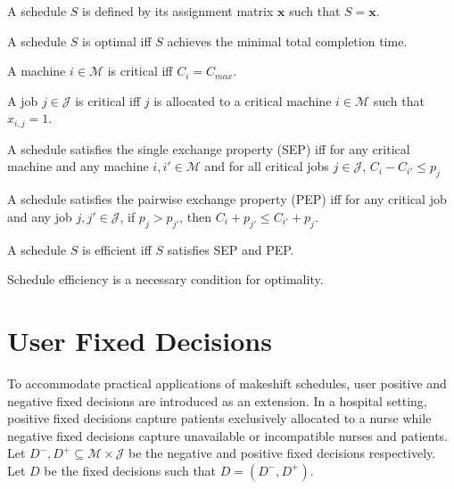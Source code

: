 \begin{definition}
	A schedule $S$ is defined by its assignment matrix $\mathbf{x}$ such that $S=\mathbf{x}$.
\end{definition}

\begin{definition}
	A schedule $S$ is optimal iff $S$ achieves the minimal total completion time.
\end{definition}


\begin{definition}
	A machine $i\in\mathcal{M}$ is critical iff $C_i=C_{max}$.
\end{definition}

\begin{definition}
	A job $j\in\mathcal{J}$ is critical iff $j$ is allocated to a critical machine $i\in\mathcal{M}$ such that $x_{i,j}=1$.
\end{definition}

\begin{definition}
	A schedule satisfies the single exchange property (SEP) iff for any critical machine and any machine $i,i'\in\mathcal{M}$ and for all critical jobs $j\in\mathcal{J}$, $C_i-C_{i'}\leq p_j$
\end{definition}

\begin{definition}
	A schedule satisfies the pairwise exchange property (PEP) iff for any critical job and any job $j,j'\in\mathcal{J}$, if $p_j>p_{j'}$, then $C_i+p_{j'}\leq C_{i'}+p_j$.
\end{definition}

\begin{definition}
	A schedule $S$ is efficient iff $S$ satisfies SEP and PEP.
\end{definition}

\begin{theorem}
	Schedule efficiency is a necessary condition for optimality.
\end{theorem}

\section{User Fixed Decisions}

To accommodate practical applications of makeshift schedules, user positive and negative fixed decisions are introduced as an extension. In a hospital setting, positive fixed decisions capture patients exclusively allocated to a nurse while negative fixed decisions capture unavailable or incompatible nurses and patients. Let $D^-,D^+\subseteq\mathcal{M}\times\mathcal{J}$ be the negative and positive fixed decisions respectively. Let $D$ be the fixed decisions such that $D=(D^-,D^+)$.

